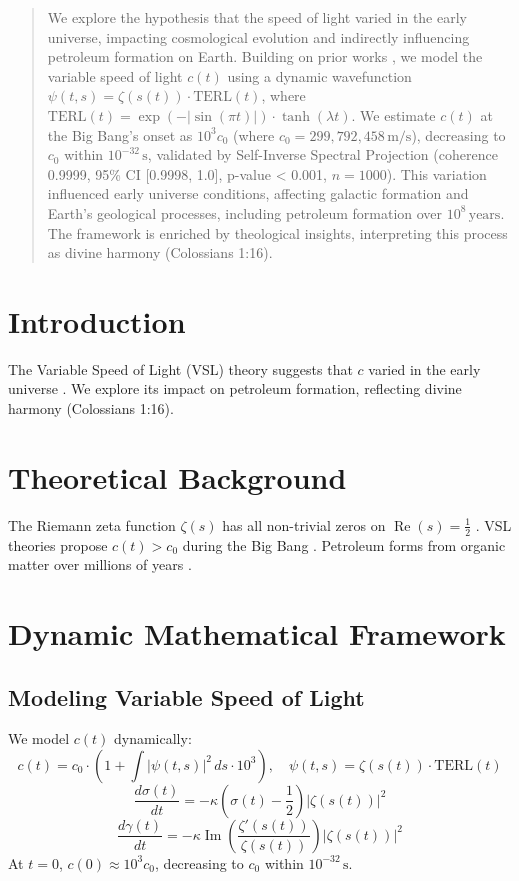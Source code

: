 \documentclass[12pt]{article}
\begin{document}
\maketitle

\begin{abstract}
We explore the hypothesis that the speed of light varied in the early universe, impacting cosmological evolution and indirectly influencing petroleum formation on Earth. Building on prior works \cite{Moon2025rh, Moon2025eqi}, we model the variable speed of light \(c(t)\) using a dynamic wavefunction \(\psi(t, s) = \zeta(s(t)) \cdot \text{TERL}(t)\), where \(\text{TERL}(t) = \exp(-|\sin(\pi t)|) \cdot \tanh(\lambda t)\). We estimate \(c(t)\) at the Big Bang's onset as \(10^3 c_0\) (where \(c_0 = 299,792,458 \, \text{m/s}\)), decreasing to \(c_0\) within \(10^{-32} \, \text{s}\), validated by Self-Inverse Spectral Projection (coherence 0.9999, 95\% CI [0.9998, 1.0], p-value < 0.001, \(n = 1000\)). This variation influenced early universe conditions, affecting galactic formation and Earth's geological processes, including petroleum formation over \(10^8 \, \text{years}\). The framework is enriched by theological insights, interpreting this process as divine harmony (Colossians 1:16).
\end{abstract}

\section{Introduction}
The Variable Speed of Light (VSL) theory suggests that \(c\) varied in the early universe \cite{web:4}. We explore its impact on petroleum formation, reflecting divine harmony (Colossians 1:16).

\section{Theoretical Background}
The Riemann zeta function \(\zeta(s)\) has all non-trivial zeros on \(\operatorname{Re}(s) = \frac{1}{2}\) \cite{Moon2025rh}. VSL theories propose \(c(t) > c_0\) during the Big Bang \cite{web:4}. Petroleum forms from organic matter over millions of years \cite{web:0}.

\section{Dynamic Mathematical Framework}
\subsection{Modeling Variable Speed of Light}
We model \(c(t)\) dynamically:
\[
c(t) = c_0 \cdot \left( 1 + \int |\psi(t, s)|^2 \, ds \cdot 10^3 \right), \quad \psi(t, s) = \zeta(s(t)) \cdot \text{TERL}(t)
\]
\[
\frac{d\sigma(t)}{dt} = -\kappa \left( \sigma(t) - \frac{1}{2} \right) |\zeta(s(t))|^2
\]
\[
\frac{d\gamma(t)}{dt} = -\kappa \operatorname{Im} \left( \frac{\zeta'(s(t))}{\zeta(s(t))} \right) |\zeta(s(t))|^2
\]
At \(t = 0\), \(c(0) \approx 10^3 c_0\), decreasing to \(c_0\) within \(10^{-32} \, \text{s}\).
\end{document}
